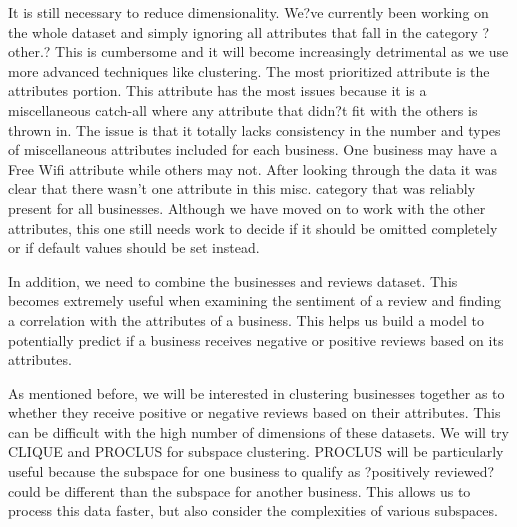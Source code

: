 \quad It is still necessary to reduce dimensionality. We?ve currently been working on the whole dataset and simply ignoring all attributes that fall in the category ?other.? This is cumbersome and it will become increasingly detrimental as we use more advanced techniques like clustering. The most prioritized attribute is the attributes portion. This attribute has the most issues because it is a miscellaneous catch-all where any attribute that didn?t fit with the others is thrown in. The issue is that it totally lacks consistency in the number and types of miscellaneous attributes included for each business. One business may have a Free Wifi attribute while others may not. After looking through the data it was clear that there wasn't one attribute in this misc. category that was reliably present for all businesses. Although we have moved on to work with the other attributes, this one still needs work to decide if it should be omitted completely or if default values should be set instead.

\quad In addition, we need to combine the businesses and reviews dataset. This becomes extremely useful when examining the sentiment of a review and finding a correlation with the attributes of a business. This helps us build a model to potentially predict if a business receives negative or positive reviews based on its attributes. 

\quad As mentioned before, we will be interested in clustering businesses together as to whether they receive positive or negative reviews based on their attributes. This can be difficult with the high number of dimensions of these datasets. We will try CLIQUE and PROCLUS for subspace clustering. PROCLUS will be particularly useful because the subspace for one business to qualify as ?positively reviewed? could be different than the subspace for another business. This allows us to process this data faster, but also consider the complexities of various subspaces. 



